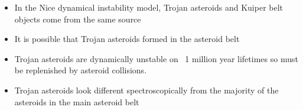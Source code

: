 \begin{enumerate}
    \begin{multicols}{2} \begin{itemize}[label={$\bullet$}]
        \item In the Nice dynamical instability model, Trojan asteroids and Kuiper belt objects come from the same source
        \item It is possible that Trojan asteroids formed in the asteroid belt
        \item Trojan asteroids are dynamically unstable on ~1 million year lifetimes so must be replenished by asteroid collisions.
        \item Trojan asteroids look different spectroscopically from the majority of the asteroids in the main asteroid belt
    \end{itemize}\end{multicols}
\end{enumerate}
